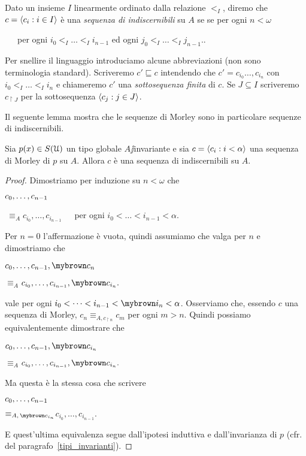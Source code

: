 \begin{definition}
Dato un insieme $I$ linearmente ordinato dalla relazione $<_I$, diremo che $c=\langle c_i:i\in I\rangle$ \`e una \emph{sequenza di indiscernibili\/} su $A$ se  se per ogni $n<\omega$

\ \ \ per ogni $i_0<_I\dots<_Ii_{n-1}$ ed ogni $j_0<_I\dots<_Ij_{n-1}$..\QED
\end{definition}

Per snellire il linguaggio introduciamo alcune abbreviazioni (non sono terminologia standard). Scriveremo \emph{$c'\sqsubseteq c$\/} intendendo che $c'=c_{i_0}\dots,c_{i_n}$ con $i_0<_I\dots<_Ii_n$ e chiameremo $c'$ una \emph{sottosequenza finita\/} di $c$. Se $J\subseteq I$ scriveremo $c_{\restriction J}$ per la sottosequenza $\langle c_j:j\in J\rangle$.

Il seguente lemma mostra che le sequenze di Morley sono in particolare sequenze di indiscernibili.

\begin{lemma}
Sia $p(x)\in S(\EuScript U)$ un tipo globale $A\jj$invariante e sia $c=\langle c_i:i<\alpha\rangle$ una sequenza di Morley di $p$ su $A$. Allora  $c$ \`e una sequenza di indiscernibili su $A$.
\end{lemma}

\begin{proof}

\def\ceq#1#2#3{\parbox[t]{20ex}{$\displaystyle #1$}{\hspace*{1ex}$\displaystyle #2$\hspace*{1ex}}{$\displaystyle #3$}}

Dimostriamo per induzione su $n<\omega$ che

\ceq{\hfill c_0,\dots,c_{n-1}}{\ \equiv_A}{c_{i_0},\dots,c_{i_{n-1}}}\ \ \ per ogni $i_0<\dots<i_{n-1}<\alpha$.

Per $n=0$ l'affermazione \`e vuota, quindi assumiamo che valga per $n$ e dimostriamo che

\ceq{\hfill c_0,\dots,c_{n-1},{\mr c_n}}{\equiv_A}{c_{i_0},\dots,c_{i_{n-1}},{\mr c_{i_n}}.}

vale per ogni $i_0<\dots< i_{n-1}<{\mr i_n}<\alpha$. Osserviamo che, essendo $c$ una sequenza di Morley, $c_n\equiv_{A,c_{\restriction n}} c_m$ per ogni $m>n$. Quindi possiamo equivalentemente dimostrare che 

\ceq{\hfill c_0,\dots,c_{n-1},{\mr c_{i_n}}}{\equiv_A}{c_{i_0},\dots,c_{i_{n-1}},{\mr c_{i_n}}.}

Ma questa \`e la stessa cosa che scrivere 

\ceq{\hfill c_0,\dots,c_{n-1}}{\equiv_{A,\,{\mr c_{i_n}}}}{c_{i_0},\dots,c_{i_{n-1}}.}

E quest'ultima equivalenza segue dall'ipotesi induttiva e dall'invarianza di $p$ (cfr.\@ {} del paragrafo~\ref{tipi_invarianti}).
\end{proof}

